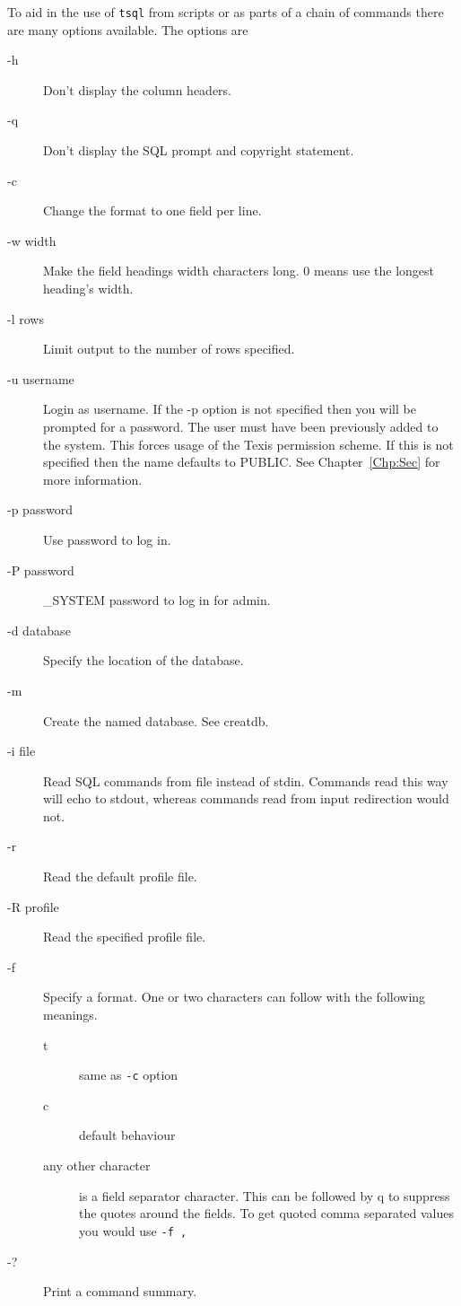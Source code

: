 To aid in the use of {\tt tsql}  from scripts or as parts of a chain
of commands there are many options available.  The options are
\begin{description}
\item[-h]       Don't display the column headers.
\item[-q]       Don't display the SQL prompt and copyright statement.
\item[-c]       Change the format to one field per line.
\item[-w width] Make the field headings width characters long.  0 means
                use the longest heading's width.
\item[-l rows]  Limit output to the number of rows specified.
\item[-u username]  Login as username.  If the -p option is not specified
                    then you will be prompted for a password.  The user
                    must have been previously added to the system.  This
                    forces usage of the Texis permission scheme.  If this
                    is not specified then the name defaults to PUBLIC.
                    See Chapter~\ref{Chp:Sec} for more
                    information.
\item[-p password]  Use password to log in.
\item[-P password]  \_SYSTEM password to log in for admin.
\item[-d database]  Specify the location of the database.
\item[-m]           Create the named database. See creatdb.
\item[-i file]      Read SQL commands from file instead of stdin.
                    Commands read this way will echo to stdout, whereas
                    commands read from input redirection would not.
\item[-r]           Read the default profile file.
\item[-R profile]   Read the specified profile file.
\item[-f]           Specify a format.  One or two characters can follow with
                    the following meanings.
                    \begin{description}
                    \item[t]  same as \verb|-c| option
                    \item[c]  default behaviour
                    \item[any other character] is a field separator character.
                    This can be followed by q to suppress the quotes around
		    the fields.
                    To get quoted comma separated values you would use
                    \verb|-f ,|
                    \end{description}
\item[-?]           Print a command summary.
\end{description}

